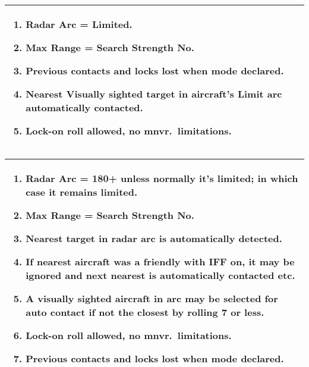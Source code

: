 \begin{onecolumntablefloat}
\begin{onecolumntable}
\begin{tabularx}{\linewidth}{X}
\toprule
\begin{enumerate}
    \item Radar Arc = Limited.
    \item Max Range = Search Strength No.
    \item Previous contacts and locks lost when mode declared.
    \item Nearest Visually sighted target in aircraft's Limit arc automatically contacted.
    \item Lock-on roll allowed, no mnvr.\ limitations.
\end{enumerate}
\\
\bottomrule
\end{tabularx}
\end{onecolumntable}
\end{onecolumntablefloat}


\begin{onecolumntablefloat}
\begin{onecolumntable}
\begin{tabularx}{\linewidth}{X}
\toprule
\begin{enumerate}
    \item Radar Arc = 180+ unless normally it's limited; in which case it remains limited.
    \item Max Range = Search Strength No.
    \item Nearest target in radar arc is automatically detected.
    \item If nearest aircraft was a friendly with IFF on, it may be ignored and next nearest is automatically contacted etc.
    \item A visually sighted aircraft in arc may be selected for auto contact if not the closest by rolling 7 or less.
    \item Lock-on roll allowed, no mnvr.\ limitations.
    \item Previous contacts and locks lost when mode declared.
\end{enumerate}
\\
\bottomrule
\end{tabularx}
\end{onecolumntable}
\end{onecolumntablefloat}
